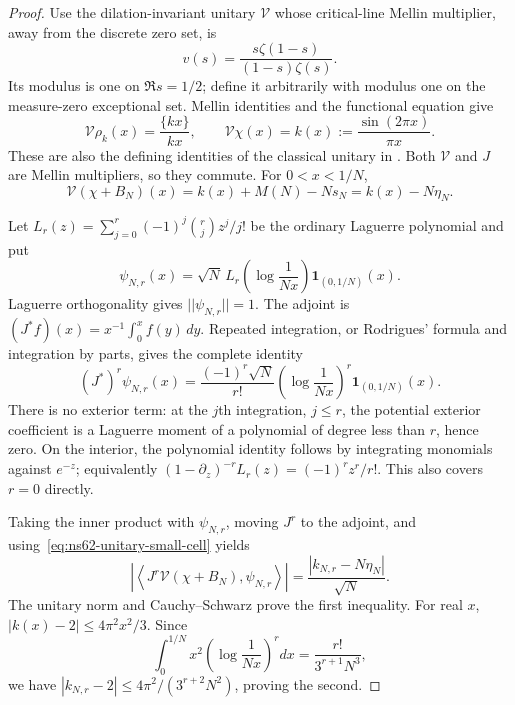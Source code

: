 \documentclass[11pt]{article}
\def\norm#1{||#1||}%
\theoremstyle{remark}
\newcommand{\norm}[1]{\left\lVert #1\right\rVert}
\begin{document}
\begin{proof}
Use the dilation-invariant unitary $\mathcal V$ whose critical-line
Mellin multiplier, away from the discrete zero set, is
\[
 v(s)=\frac{s\zeta(1-s)}{(1-s)\zeta(s)}.
\]
Its modulus is one on $\Re s=1/2$; define it arbitrarily with modulus
one on the measure-zero exceptional set. Mellin identities and the
functional equation give
\[
 \mathcal V\rho_k(x)=\frac{\{kx\}}{kx},\qquad
 \mathcal V\chi(x)=k(x):=\frac{\sin(2\pi x)}{\pi x}.
\]
These are also the defining identities of the classical unitary in
\cite[Section 4]{BaezDuarte2000Arithmetic}. Both $\mathcal V$ and $J$
are Mellin multipliers, so they commute. For $0<x<1/N$,
\begin{equation}
 \mathcal V(\chi+B_N)(x)=k(x)+M(N)-Ns_N=k(x)-N\eta_N.
 \label{eq:ns62-unitary-small-cell}
\end{equation}

Let $L_r(z)=\sum_{j=0}^r(-1)^j\binom rj z^j/j!$ be the ordinary
Laguerre polynomial and put
\[
 \psi_{N,r}(x)=\sqrt N\,
       L_r\left(\log\frac1{Nx}\right)\mathbf1_{(0,1/N)}(x).
\]
Laguerre orthogonality \cite[Table 18.3.1]{DLMFLaguerre} gives
$\norm{\psi_{N,r}}=1$. The adjoint is
$(J^*f)(x)=x^{-1}\int_0^x f(y)\,dy$. Repeated integration, or
Rodrigues' formula and integration by parts, gives the complete
identity
\begin{equation}
 (J^*)^r\psi_{N,r}(x)=
 \frac{(-1)^r\sqrt N}{r!}
       \left(\log\frac1{Nx}\right)^r\mathbf1_{(0,1/N)}(x).
 \label{eq:ns62-adjoint-laguerre}
\end{equation}
There is no exterior term: at the $j$th integration, $j\leq r$,
the potential exterior coefficient is a Laguerre moment of a
polynomial of degree less than $r$, hence zero. On the interior,
the polynomial identity follows by integrating monomials against
$e^{-z}$; equivalently $(1-\partial_z)^{-r}L_r(z)=(-1)^rz^r/r!$.
This also covers $r=0$ directly.

Taking the inner product with $\psi_{N,r}$, moving $J^r$ to the
adjoint, and using~\eqref{eq:ns62-unitary-small-cell} yields
\[
 \left|\left\langle J^r\mathcal V(\chi+B_N),\psi_{N,r}\right\rangle\right|
       =\frac{|k_{N,r}-N\eta_N|}{\sqrt N}.
\]
The unitary norm and Cauchy--Schwarz prove the first inequality.
For real $x$, $|k(x)-2|\leq4\pi^2x^2/3$. Since
\[
 \int_0^{1/N}x^2\left(\log\frac1{Nx}\right)^r dx
        =\frac{r!}{3^{r+1}N^3},
\]
we have $|k_{N,r}-2|\leq4\pi^2/(3^{r+2}N^2)$, proving the second.


\end{proof}
\end{document}
